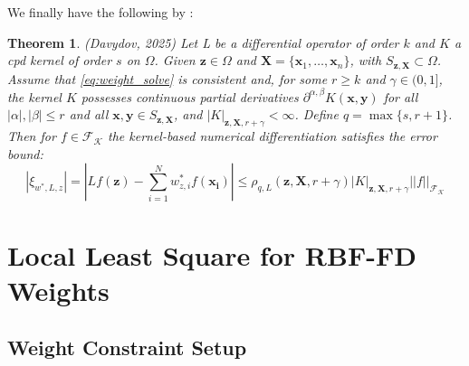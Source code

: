 \documentclass[11pt]{article}
\newtheorem{theorem}{Theorem}
\begin{document}
We finally have the following by \cite{Davydov2025}:
\begin{theorem}
(Davydov, 2025) Let L be a differential operator of order $k$ and $K$ a cpd kernel of order $s$ on $\Omega$. Given $\bm{z}\in \Omega$ and $\bm{X}=\{ \bm{x}_1, \dots, \bm{x}_n \}$, with $S_{\bm{z},\bm{X}} \subset \Omega$. Assume that \ref{eq:weight_solve} is consistent and, for some $r \ge k$ and $\gamma \in (0,1]$, the kernel $K$ possesses continuous partial derivatives $\partial^{\alpha, \beta}K(\bm{x},\bm{y})$ for all $|\alpha|,|\beta| \le r$ and all $\bm{x},\bm{y} \in S_{\bm{z},\bm{X}}$, and $|K|_{\bm{z},\bm{X},r+\gamma} < \infty$. Define $q=\max\{ s, r+1 \}$. Then for $f \in \mathcal{F_K}$ the kernel-based numerical differentiation satisfies the error bound:
\begin{equation}
\left| \xi_{w^*,L,z} \right| = \left| Lf(\bm{z}) -\sum_{i=1}^N w_{z,i}^*f(\bm{x_i}) \right| \le \rho_{q, L}(\bm{z}, \bm{X}, r+\gamma) |K|_{\bm{z},\bm{X},r+\gamma} || f ||_{\mathcal{F_K}}
\end{equation}
\end{theorem}

\pagebreak

\section{Local Least Square for RBF-FD Weights}

\subsection{Weight Constraint Setup}
\end{document}
